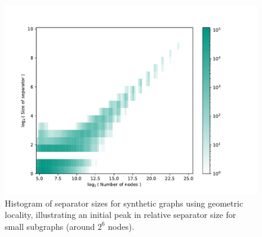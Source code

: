 \begin{figure}[tbhp]
    \centering
    \includegraphics[width=0.7\linewidth]{graphics/local_embedding-hist.pdf}
    \caption{Histogram of separator sizes for synthetic graphs using geometric locality, illustrating an initial peak in relative separator size for small subgraphs (around \(2^6\) nodes).}
    \label{fig:local_embedding_hist_deviation}
\end{figure}




